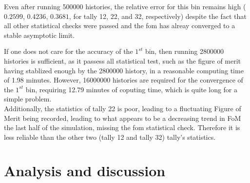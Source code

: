 \documentclass[a4paper, 12pt]{article}
\begin{document}
Even after running 500000 histories, the relative error for this bin remains high ($0.2599$, $0.4236$, $0.3681$, for tally 12, 22, and 32, respectively) despite the fact that all other statistical checks were passed and the fom has alreay converged to a stable asymptotic limit.

If one does not care for the accuracy of the $1^{st}$ bin, then running 2800000 histories is sufficient, as it passess all statistical test, such as the figure of merit having stablized enough by the 2800000 history, in a reasonable computing time of 1.98 minutes. However, 16000000 histories are required for the convergence of the $1^{st}$ bin, requiring 12.79 minutes of coputing time, which is quite long for a simple problem.
\\Additionally, the statistics of tally 22 is poor, leading to a fluctuating Figure of Merit being recorded, leading to what appears to be a decreasing trend in FoM the last half of the simulation, missing the fom statistical check. Therefore it is less reliable than the other two (tally 12 and tally 32) tally's statistics.

\section{Analysis and discussion}
\end{document}
